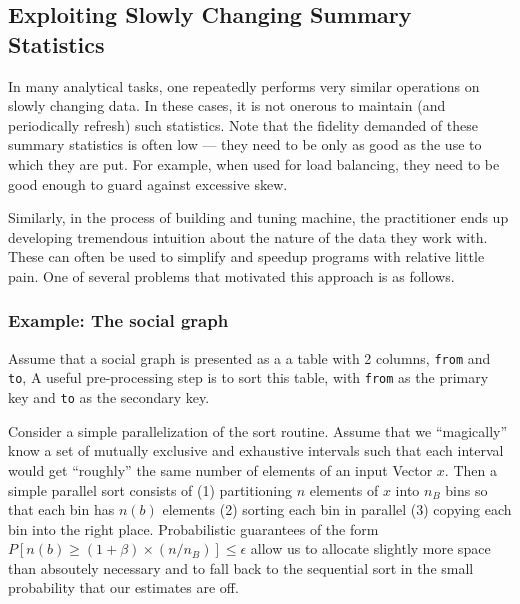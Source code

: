 \subsection{Exploiting Slowly Changing Summary Statistics}

In many analytical tasks, one repeatedly performs very similar operations on slowly
changing data. In these cases, 
it is not onerous to maintain (and periodically refresh) such statistics. 
Note that the fidelity demanded of these summary statistics is often low ---
they need to be only as good as the use to which they are put. For example, when
used for load balancing, they need to be good enough to guard against excessive
skew.

Similarly, 
in the process of building and tuning machine, the practitioner ends up
developing tremendous intuition about the nature of the data they work with.
These can often be used to simplify and speedup programs with relative little
pain. One of several problems that motivated this approach is as follows.



\subsubsection{Example: The social graph}

Assume that a social graph is presented as a 
a table with 2 columns, {\tt from} and {\tt to},
A useful pre-processing step is to sort this table, with {\tt from} as the
primary key and {\tt to} as the secondary key.

Consider a simple parallelization of the sort routine. Assume that we 
``magically'' know a set of mutually exclusive and exhaustive intervals such
that each interval would get ``roughly'' the same number of elements of an input
Vector \(x\). Then a simple parallel sort consists of 
(1) partitioning \(n\) elements of \(x\) into \(n_B\) bins so that each bin has
\(n(b)\) elements
(2) sorting each bin in parallel
(3) copying each bin into the right place. Probabilistic guarantees
of the form \(P[n(b) \geq (1+\beta) \times(n/n_B)] \leq \epsilon\) 
allow us to allocate slightly more space than absoutely necessary and to 
fall back to the sequential sort in the small probability that our estimates are off.

